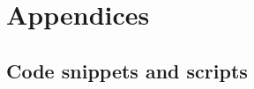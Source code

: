 \documentclass[12pt, TexShade, letterpaper]{report}
\begin{document}

\chapter{Appendices}
\section{Code snippets and scripts}	
\label{chap:appendix,sub:code}
	{
	
	
	
	
	}
\end{document}
